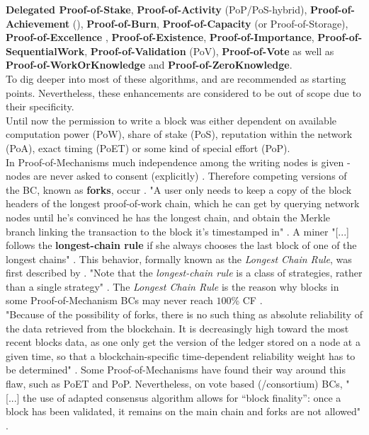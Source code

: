 \textbf{Delegated Proof-of-Stake}, \textbf{Proof-of-Activity} (\gls{PoP}/\gls{PoS}-hybrid), \textbf{Proof-of-Achievement} (\citet{Komiya.2019}),
\textbf{Proof-of-Burn}, \textbf{Proof-of-Capacity} (or Proof-of-Storage), \textbf{Proof-of-Excellence} \cite[5]{King.2012}, \textbf{Proof-of-Existence}, \textbf{Proof-of-Importance},
\textbf{Proof-of-SequentialWork}, \textbf{Proof-of-Validation} (PoV), \textbf{Proof-of-Vote} as well as \textbf{Proof-of-WorkOrKnowledge} and \textbf{Proof-of-ZeroKnowledge}. \\
To dig deeper into most of these algorithms, \citet[5]{Butijn.2020} and \citet[3]{Angelis.2018} are recommended as starting points.
Nevertheless, these enhancements are considered to be out of scope due to their specificity. \\
Until now the permission to write a block was either dependent on available computation power (\gls{PoW}),
share of stake (\gls{PoS}), reputation within the network (\gls{PoA}),
exact timing (\gls{PoET}) or some kind of special effort (\gls{PoP}). \\
In Proof-of-Mechanisms much independence among the writing nodes is given - nodes are never asked to consent (explicitly) \cite[8]{Nakamoto.2009}.
Therefore competing versions of the \gls{BC}, known as \textbf{forks}, occur \cite[60]{Butijn.2020}.
"A user only needs to keep a copy of the block headers of the longest proof-of-work chain, which he can get by querying network nodes until he's convinced he has the longest chain, and obtain the Merkle branch linking the transaction to the block it's timestamped in" \cite[5]{Nakamoto.2009}.
A miner "[...] follows the \textbf{longest-chain rule} if she always chooses the last block of one of the longest chains" \cite[2]{Ewerhart.2020}.
This behavior, formally known as the \textit{Longest Chain Rule}, was first described by \citet{Courtois.2014}.
"Note that the \textit{longest-chain rule} is a class of strategies, rather than a single strategy" \cite[2]{Ewerhart.2020}.
The \textit{Longest Chain Rule} is the reason why blocks in some Proof-of-Mechanism \gls{BC}s may never reach $100$\% \gls{CF} \cite[3]{Angelis.2018}. \\
"Because of the possibility of forks, there is no such thing as absolute reliability of the data retrieved from the blockchain.
It is decreasingly high toward the most recent blocks data, as one only get the version of the ledger stored on a node at a given time,
so that a blockchain-specific time-dependent reliability weight has to be determined" \cite[62]{Dib.2018}.
Some Proof-of-Mechanisms have found their way around this flaw, such as \gls{PoET} and \gls{PoP}.
Nevertheless, on vote based (/consortium) \gls{BC}s, "[...] the use of adapted
consensus algorithm allows for “block finality”: once a block has been validated,
it remains on the main chain and forks are not allowed" \cite[54]{Dib.2018}.

